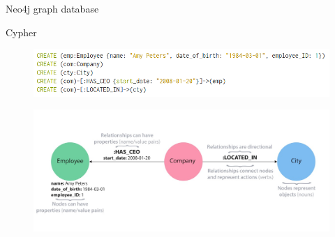 \documentclass{beamer}
\begin{document}
\begin{frame}{Neo4j graph database}
    \begin{block}{Cypher}
        \begin{figure}
            \centering
            \includegraphics[width=\linewidth]{create_query.png}
        \end{figure}
    \end{block}
    \begin{figure}
        \centering
        \includegraphics[clip=true,width=\linewidth]{property_graph_elements.jpg}
    \end{figure}
\end{frame}
\end{document}
